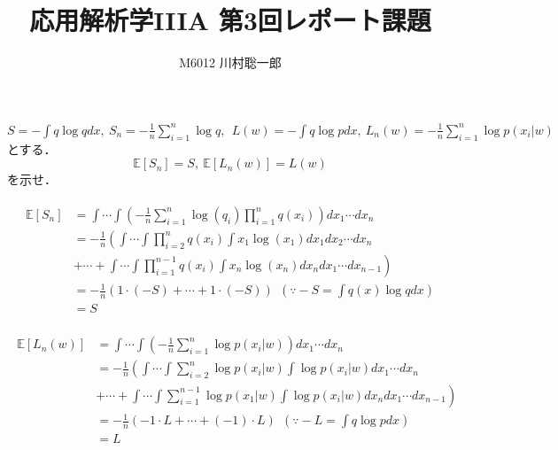 \documentclass[dvipdfmx]{jsreport}
\title{応用解析学IIIA 第3回レポート課題}
\author{M6012 川村聡一郎}
\date{}
\begin{document}
\maketitle

\begin{tcolorbox}
    $S= -\int q\log{q}dx,\ S_n= -\frac{1}{n}\sum_{i= 1}^n \log{q},\ \ L(w)= -\int q\log{p}dx,\ L_n(w)= -\frac{1}{n}\sum_{i= 1}^n \log{p(x_i| w)}$とする．
\begin{equation*}
    \mathbb{E}[S_n]= S,\ \mathbb{E}[L_n(w)]= L(w)
\end{equation*}
    を示せ．
\end{tcolorbox}

\begin{souanswer}
\begin{align*}
\begin{split}
    \mathbb{E}[S_n]
    &= \int\cdots \int \left(-\frac{1}{n}\sum_{i= 1}^n\log{(q_i)} \prod_{i= 1}^n q{(x_i)}\right)dx_1\cdots dx_n\\
    &= -\frac{1}{n}\left(\int\cdots \int \prod_{i= 2}^n q{(x_i)}\int x_1\log{(x_1)}dx_1dx_2\cdots dx_n\right.\\
    & \left.+ \cdots+ \int\cdots \int \prod_{i= 1}^{n- 1}q{(x_i)}\int x_n\log{(x_n)}dx_ndx_1\cdots dx_{n- 1}\right)\\
    &= -\frac{1}{n}\left(1\cdot (-S)+ \cdots+ 1\cdot (-S)\right)\ \ \left(\because -S= \int q(x)\log{q}dx\right)\\
    &= S
\end{split}
\end{align*}

\begin{align*}
\begin{split}
    \mathbb{E}[L_n(w)]
    &= \int\cdots \int \left(-\frac{1}{n}\sum_{i= 1}^n \log{p(x_i| w)}\right)dx_1\cdots dx_n\\
    &= -\frac{1}{n}\left(\int\cdots \int \sum_{i= 2}^n \log{p(x_i| w)}\int \log{p(x_i| w)}dx_1\cdots dx_n\right.\\
    &\left.+ \cdots+ \int\cdots \int \sum_{i= 1}^{n- 1} \log{p(x_1| w)}\int \log{p(x_i| w)} dx_ndx_1\cdots dx_{n- 1}\right)\\
    &= -\frac{1}{n}(-1\cdot L+ \cdots+ (-1)\cdot L)\ \ \left(\because -L= \int q\log{p}dx\right)\\
    &= L
\end{split}
\end{align*}
\end{souanswer}
\end{document}
